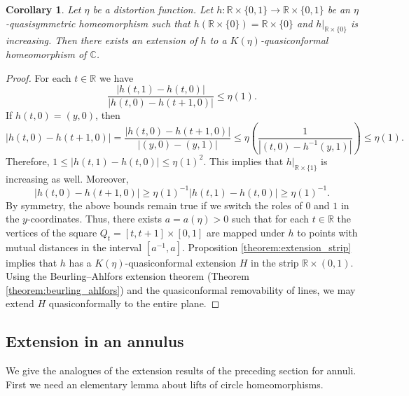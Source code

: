 \documentclass[letterpaper]{amsart}
\theoremstyle{plain}
\newtheorem{corollary}[theorem]{Corollary}
\theoremstyle{definition}
\theoremstyle{remark}
\numberwithin{equation}{section}
\numberwithin{theorem}{section}
\newcommand{\R}{\mathbb R}
\newcommand{\C}{\mathbb C}
\begin{document}
\begin{corollary}\label{corollary:extension_strip}
Let $\eta$ be a distortion function. Let $h\colon \R\times \{0,1\}\to \R\times \{0,1\}$ be an $\eta$-quasi\-symmetric homeomorphism such that $h(\R\times \{0\})=\R\times \{0\}$ and $h|_{\R\times \{0\}}$ is increasing. Then there exists an extension of $h$ to a $K(\eta)$-quasiconformal homeomorphism of $\C$.
\end{corollary}

\begin{proof}
For each $t\in \R$ we have 
$$ \frac{|h(t,1)-h(t,0)|}{|h(t,0)-h(t+1,0)|} \leq  \eta(1).$$
If $h(t,0)=(y,0)$, then 
$$|h(t,0)-h(t+1,0)| = \frac{|h(t,0)-h(t+1,0)|}{|(y,0)-(y,1)|} \leq \eta\left( \frac{1}{|(t,0)-h^{-1}(y,1)|}\right) \leq \eta(1).$$
Therefore, $1\leq |h(t,1)-h(t,0)|\leq \eta(1)^2$. This implies that $h|_{\R\times \{1\}}$ is increasing as well. Moreover, 
$$|h(t,0)-h(t+1,0)|\geq \eta(1)^{-1} |h(t,1)-h(t,0)|  \geq \eta(1)^{-1}.$$
By symmetry, the above bounds remain true if we switch the roles of $0$ and $1$ in the $y$-coordinates. Thus, there exists $a=a(\eta)>0$ such that for each $t\in \R$ the vertices of the square $Q_t=[t,t+1]\times [0,1]$ are mapped under $h$ to points with mutual distances in the interval $[a^{-1},a]$. Proposition \ref{theorem:extension_strip} implies that $h$ has a $K(\eta)$-quasiconformal extension $H$ in the strip $\R\times (0,1)$. Using the Beurling--Ahlfors extension theorem (Theorem \ref{theorem:beurling_ahlfors}) and the quasiconformal removability of lines, we may extend $H$ quasiconformally to the entire plane. 
\end{proof}

\subsection{Extension in an annulus}
We give the analogues of the extension results of the preceding section for annuli. First we need an elementary lemma about lifts of circle homeomorphisms.
\end{document}
